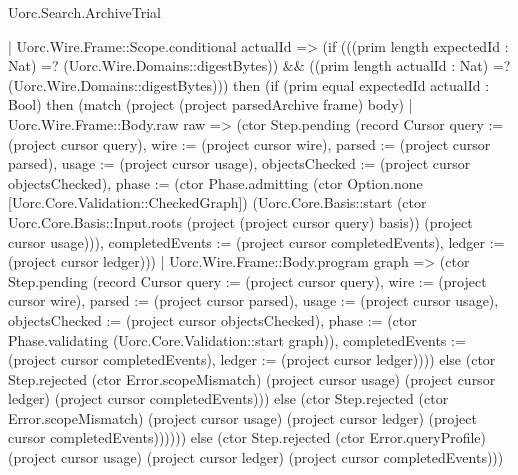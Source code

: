 \begin{lexlean}{Uorc.Search.ArchiveTrial}
\begin{semanticmodule}
{        | Uorc.Wire.Frame::Scope.conditional actualId => (if (((prim length expectedId : Nat) =? (Uorc.Wire.Domains::digestBytes)) && ((prim length actualId : Nat) =? (Uorc.Wire.Domains::digestBytes))) then (if (prim equal expectedId actualId : Bool) then (match (project (project parsedArchive frame) body)
          | Uorc.Wire.Frame::Body.raw raw => (ctor Step.pending (record Cursor {query := (project cursor query), wire := (project cursor wire), parsed := (project cursor parsed), usage := (project cursor usage), objectsChecked := (project cursor objectsChecked), phase := (ctor Phase.admitting (ctor Option.none [Uorc.Core.Validation::CheckedGraph]) (Uorc.Core.Basis::start (ctor Uorc.Core.Basis::Input.roots (project (project cursor query) basis)) (project cursor usage))), completedEvents := (project cursor completedEvents), ledger := (project cursor ledger)}))
          | Uorc.Wire.Frame::Body.program graph => (ctor Step.pending (record Cursor {query := (project cursor query), wire := (project cursor wire), parsed := (project cursor parsed), usage := (project cursor usage), objectsChecked := (project cursor objectsChecked), phase := (ctor Phase.validating (Uorc.Core.Validation::start graph)), completedEvents := (project cursor completedEvents), ledger := (project cursor ledger)}))) else (ctor Step.rejected (ctor Error.scopeMismatch) (project cursor usage) (project cursor ledger) (project cursor completedEvents))) else (ctor Step.rejected (ctor Error.scopeMismatch) (project cursor usage) (project cursor ledger) (project cursor completedEvents)))))) else (ctor Step.rejected (ctor Error.queryProfile) (project cursor usage) (project cursor ledger) (project cursor completedEvents)))
}


\end{semanticmodule}
\end{lexlean}
